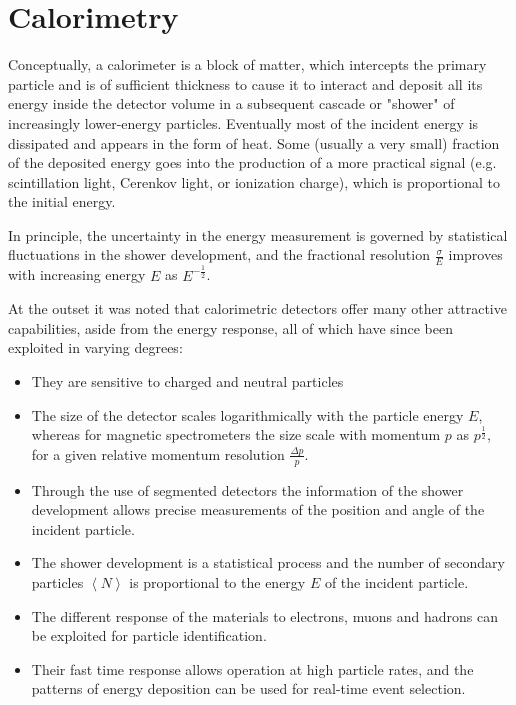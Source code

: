 \documentclass[../../main/main.tex]{subfiles}
\begin{document}
\section{Calorimetry}

Conceptually, a calorimeter is a block of matter, which intercepts the primary particle and is of sufficient thickness to cause it to interact and deposit all its energy inside the detector volume in a subsequent cascade or "shower" of increasingly lower-energy particles. Eventually most of the incident energy is dissipated and appears in the form of heat. Some (usually a very small) fraction of the deposited energy goes into the production of a more practical signal (e.g. scintillation light, Cerenkov light, or ionization charge), which is proportional to the initial energy.

In principle, the uncertainty in the energy measurement is governed by statistical fluctuations in the shower development, and the fractional resolution \( \frac{\sigma}{E} \) improves with increasing energy \( E \) as \( E^{-\frac{1}{2}} \).

At the outset it was noted that calorimetric detectors offer many other attractive capabilities, aside from the energy response, all of which have since been exploited in varying degrees:
\begin{itemize}
	\item They are sensitive to charged and neutral particles
	\item The size of the detector scales logarithmically with the particle energy \( E \), whereas for magnetic spectrometers the size scale with momentum \( p \) as \( p^{\frac{1}{2}} \), for a given relative momentum resolution \( \frac{\Delta p}{p} \).
	\item Through the use of segmented detectors the information of the shower development allows precise measurements of the position and angle of the incident particle.
	\item The shower development is a statistical process and the number of secondary particles \( \left\langle N \right\rangle \) is proportional to the energy \( E \) of the incident particle.
	\item The different response of the materials to electrons, muons and hadrons can be exploited for particle identification.
	\item Their fast time response allows operation at high particle rates, and the patterns of energy deposition can be used for real-time event selection.
\end{itemize}
\end{document}
